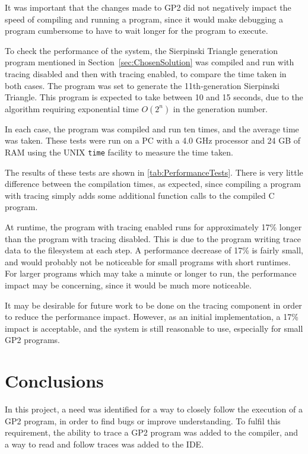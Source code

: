 \documentclass[authoryearcitations]{UoYCSproject}
\begin{document}
It was important that the changes made to GP2 did not negatively impact the speed
of compiling and running a program, since it would make debugging a program
cumbersome to have to wait longer for the program to execute.

To check the performance of the system, the Sierpinski Triangle generation
program mentioned in Section~\ref{sec:ChosenSolution} was compiled and run with
tracing disabled and then with tracing enabled, to compare the time taken in
both cases. The program was set to generate the 11th-generation Sierpinski
Triangle. This program is expected to take between 10 and 15 seconds, due to the
algorithm requiring exponential time $O(2^{n})$ in the generation number.

In each case, the program was compiled and run ten times, and the average time
was taken. These tests were run on a PC with a 4.0 GHz processor and 24 GB of RAM
using the UNIX \texttt{time} facility to measure the time taken.

The results of these tests are shown in \autoref{tab:PerformanceTests}. There
is very little difference between the compilation times, as expected, since compiling
a program with tracing simply adds some additional function calls to the compiled
C program.

At runtime, the program with tracing enabled runs for approximately 17\% longer
than the program with tracing disabled. This is due to the program writing trace
data to the filesystem at each step. A performance decrease of 17\% is fairly small,
and would probably not be noticeable for small programs with short runtimes. For
larger programs which may take a minute or longer to run, the performance impact
may be concerning, since it would be much more noticeable.

It may be desirable for future work to be done on the tracing component in order
to reduce the performance impact. However, as an initial implementation, a 17\%
impact is acceptable, and the system is still reasonable to use, especially for
small GP2 programs.

\clearpage


\chapter{Conclusions}
\label{cha:Conclusions}

In this project, a need was identified for a way to closely follow the execution
of a GP2 program, in order to find bugs or improve understanding. To fulfil this
requirement, the ability to trace a GP2 program was added to the compiler, and
a way to read and follow traces was added to the IDE.
\end{document}

